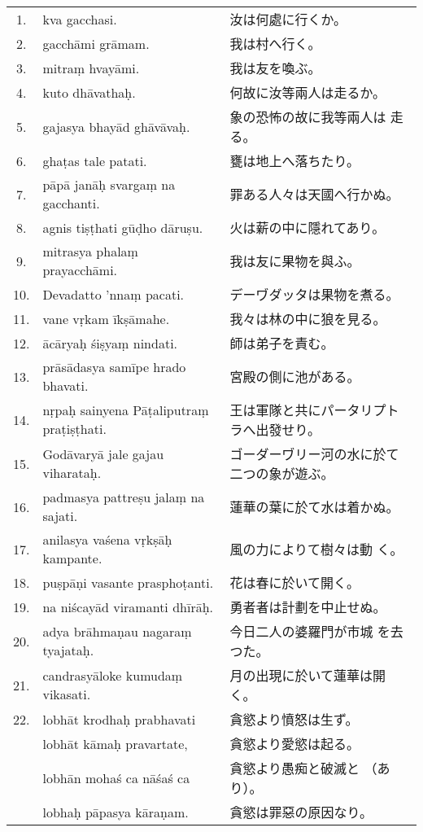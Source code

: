 \begin{longtable}{c*{2}{p{0.45\hsize}}}
 1. & kva gacchasi. & 汝は何處に行くか。\\
 2. & gacchāmi grāmam. & 我は村へ行く。\\
 3. & mitraṃ hvayāmi. & 我は友を喚ぶ。\\
 4. & kuto dhāvathaḥ. & 何故に汝等兩人は走るか。\\
 5. & gajasya bhayād ghāvāvaḥ. & 象の恐怖の故に我等兩人は
走る。\\
 6. & ghaṭas tale patati. & 甕は地上へ落ちたり。\\
 7. & pāpā janāḥ svargaṃ na gacchanti. & 罪ある人々は天國へ行かぬ。\\
 8. & agnis tiṣṭhati gūḍho dāruṣu. & 火は薪の中に隱れてあり。\\
 9. & mitrasya phalaṃ prayacchāmi. & 我は友に果物を與ふ。\\
10. & Devadatto 'nnaṃ pacati. & デーヷダッタは果物を煮る。\\
11. & vane vṛkam īkṣāmahe. & 我々は林の中に狼を見る。\\
12. & ācāryaḥ śiṣyaṃ nindati. & 師は弟子を責む。\\
13. & prāsādasya samīpe hrado bhavati. & 宮殿の側に池がある。\\
14. & nṛpaḥ sainyena Pāṭaliputraṃ praṭiṣṭhati. & 王は軍隊と共にパータリプトラへ出發せり。\\
15. & Godāvaryā jale gajau viha\-rataḥ. & ゴーダーヷリー河の水に於て二つの象が遊ぶ。\\
16. & padmasya pattreṣu jalaṃ na sajati. & 蓮華の葉に於て水は着かぬ。\\
17. & anilasya vaśena vṛkṣāḥ kam\-pante. & 風の力によりて樹々は動
く。\\
18. & puṣpāṇi vasante prasphoṭanti. & 花は春に於いて開く。\\
19. & na niścayād viramanti dhīrāḥ. & 勇者者は計劃を中止せぬ。\\
20. & adya brāhmaṇau nagaraṃ tyajataḥ. & 今日二人の婆羅門が市城
を去つた。\\
21. & candrasyāloke kumudaṃ vika\-sati. & 月の出現に於いて蓮華は開
く。\\
22. & lobhāt krodhaḥ prabhavati & 貪慾より憤怒は生ず。\\
    & lobhāt kāmaḥ pravartate, & 貪慾より愛慾は起る。\\
    & lobhān mohaś ca nāśaś ca & 貪慾より愚痴と破滅と
（あり）。\\
    & lobhaḥ pāpasya kāraṇam. & 貪慾は罪惡の原因なり。
\end{longtable}


